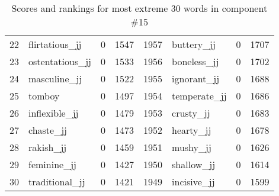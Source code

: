 \begin{table}[tbp]
\begin{tabular}{| rlr@{.}l | rlr@{.}l |}
    22 & flirtatious\_jj & 0 & 1547    &    1957 & buttery\_jj & 0 & 1707 \\
    23 & ostentatious\_jj & 0 & 1533    &    1956 & boneless\_jj & 0 & 1702 \\
    24 & masculine\_jj & 0 & 1522    &    1955 & ignorant\_jj & 0 & 1688 \\
    25 & tomboy & 0 & 1497    &    1954 & temperate\_jj & 0 & 1686 \\
    26 & inflexible\_jj & 0 & 1479    &    1953 & crusty\_jj & 0 & 1683 \\
    27 & chaste\_jj & 0 & 1473    &    1952 & hearty\_jj & 0 & 1678 \\
    28 & rakish\_jj & 0 & 1459    &    1951 & mushy\_jj & 0 & 1626 \\
    29 & feminine\_jj & 0 & 1427    &    1950 & shallow\_jj & 0 & 1614 \\
    30 & traditional\_jj & 0 & 1421    &    1949 & incisive\_jj & 0 & 1599 \\
    \hline
    \end{tabular}
    \caption{Scores and rankings for most extreme 30 words in component \#15} 
\end{table}
\clearpage
